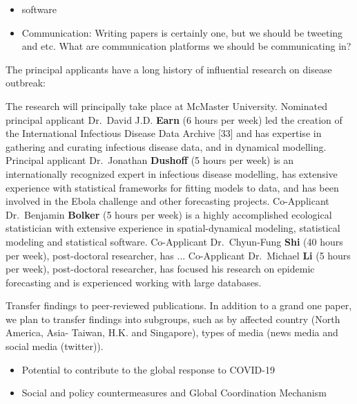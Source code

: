 \begin{itemize}
\item{software}
\item{Communication: Writing papers is certainly one, but we should be tweeting and etc. What are communication platforms we should be communicating in?}
\end{itemize}



The principal applicants have a long history of influential research on disease outbreak: 

The research will principally take place at McMaster University. 
Nominated principal applicant Dr.\ David J.D. \textbf{Earn} (6 hours per week) led the creation of the International Infectious Disease Data Archive [33] and has expertise in gathering and curating infectious disease data, and in dynamical modelling.
Principal applicant Dr.\ Jonathan \textbf{Dushoff} (5 hours per week) is an internationally recognized expert in infectious disease modelling, has extensive experience with statistical frameworks for fitting models to data, and has been involved in the Ebola challenge and other forecasting projects. 
Co-Applicant Dr.\ Benjamin \textbf{Bolker} (5 hours per week) is a highly accomplished ecological statistician with extensive experience in spatial-dynamical modeling, statistical modeling and statistical software.
Co-Applicant Dr.\ Chyun-Fung \textbf{Shi} (40 hours per week), post-doctoral researcher, has ...
Co-Applicant Dr.\ Michael \textbf{Li} (5 hours per week), post-doctoral researcher, has focused his research on epidemic forecasting and is experienced working with large databases. 







Transfer findings to peer-reviewed publications.  
In addition to a grand one paper, we plan to transfer findings into subgroups, such as by affected country (North America, Asia- Taiwan, H.K. and Singapore), types of media (news media and social media (twitter)).

\begin{itemize}
\item{Potential to contribute to the global response to COVID-19}
\item{Social and policy countermeasures and Global Coordination Mechanism}
\end{itemize}

